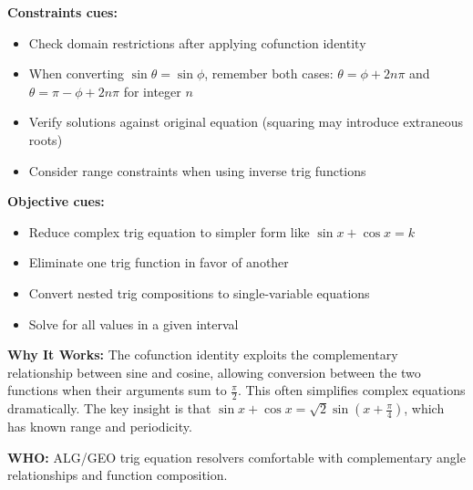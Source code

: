 \documentclass[12pt]{article}
\begin{document}
\textbf{Constraints cues:}
\begin{itemize}
    \item Check domain restrictions after applying cofunction identity
    \item When converting $\sin\theta = \sin\phi$, remember both cases: $\theta = \phi + 2n\pi$ and $\theta = \pi - \phi + 2n\pi$ for integer $n$
    \item Verify solutions against original equation (squaring may introduce extraneous roots)
    \item Consider range constraints when using inverse trig functions
\end{itemize}

\textbf{Objective cues:}
\begin{itemize}
    \item Reduce complex trig equation to simpler form like $\sin x + \cos x = k$
    \item Eliminate one trig function in favor of another
    \item Convert nested trig compositions to single-variable equations
    \item Solve for all values in a given interval
\end{itemize}

\textbf{Why It Works:} The cofunction identity exploits the complementary relationship between sine and cosine, allowing conversion between the two functions when their arguments sum to $\frac{\pi}{2}$. This often simplifies complex equations dramatically. The key insight is that $\sin x + \cos x = \sqrt{2}\sin(x + \frac{\pi}{4})$, which has known range and periodicity.

\textbf{WHO:} ALG/GEO trig equation resolvers comfortable with complementary angle relationships and function composition.
\end{document}
